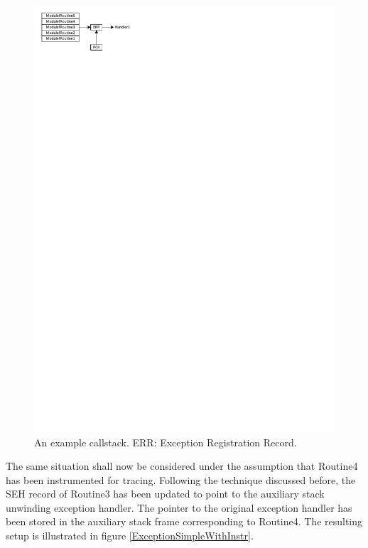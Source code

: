 \begin{figure}[htbp] 
\begin{centering} 
\includegraphics[scale=1.2, clip=true, viewport=0cm 26cm 8.5cm 30cm]{images/diagrams/ExceptionSimple.pdf} 
\caption[An example callstack]{An example callstack. ERR: Exception Registration Record.} 
\label{ExceptionSimple} 
\end{centering} 
\end{figure}

The same situation shall now be considered under the assumption that Routine4 has 
been instrumented for tracing. Following the technique discussed before, the
SEH record of Routine3 has been updated to point to the auxiliary stack 
unwinding exception handler. The pointer to the original exception handler has
been stored in the auxiliary stack frame corresponding to Routine4. The resulting
setup is illustrated in figure \ref{ExceptionSimpleWithInstr}.

